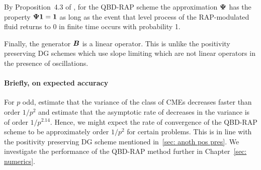By Proposition~4.3 of \cite{p2019}, for the QBD-RAP scheme the approximation \(\boldsymbol \Psi\) has the property \(\boldsymbol \Psi \boldsymbol 1=\boldsymbol 1\) as long as the event that level process of the RAP-modulated fluid returns to \(0\) in finite time occurs with probability 1. 

Finally, the generator \(\boldsymbol B\) is a linear operator. This is unlike the positivity preserving DG schemes which use slope limiting which are not linear operators in the presence of oscillations.

\paragraph{Briefly, on expected accuracy} 
For \(p\) odd, \cite{hht2020} estimate that the variance of the class of CMEs decreases faster than order \(1/p^2\) and estimate that the asymptotic rate of decreases in the variance is of order \(1/p^{2.14}\). Hence, we might expect the rate of convergence of the QBD-RAP scheme to be approximately order \(1/p^2\) for certain problems. This is in line with the positivity preserving DG scheme mentioned in~\ref{sec: anoth pos pres}. We investigate the performance of the QBD-RAP method further in Chapter~\ref{sec: numerics}.  %















